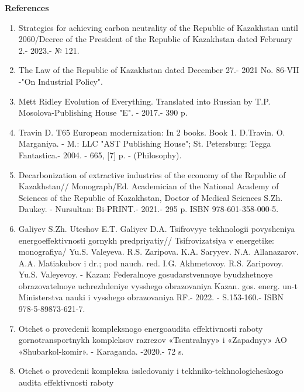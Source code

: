 \begin{center}
{\bfseries References}
\end{center}

\begin{enumerate}
\item
Strategies for achieving carbon neutrality of the Republic of
Kazakhstan until 2060/Decree of the President of the Republic of
Kazakhstan dated February 2.- 2023.- № 121.

\item
The Law of the Republic of Kazakhstan dated December 27.- 2021 No.
86-VII -"On Industrial Policy".

\item
Mеtt Ridley Evolution of Everything. Translated into Russian by T.P.
Mosolova-Publishing House "E". - 2017.- 390 p.

\item
Travin D. T65 European modernization: In 2 books. Book 1. D.Travin.
O. Marganiya. - M.: LLC "AST Publishing House"; St. Petersburg: Tegga
Fantastica.- 2004. - 665, {[}7{]} p. - (Philosophy).

\item
Decarbonization of extractive industries of the economy of the
Republic of Kazakhstan// Monograph/Ed. Academician of the National
Academy of Sciences of the Republic of Kazakhstan, Doctor of Medical
Sciences S.Zh. Daukey. - Nursultan: Bi-PRINT.- 2021.- 295 p. ISBN
978-601-358-000-5.

\item
Galiyev S.Zh. Uteshov E.T. Galiyev D.A. Tsifrovyye tekhnologii
povysheniya energoeffektivnosti gornykh predpriyatiy// Tsifrovizatsiya v
energetike: monografiya/ Yu.S. Valeyeva. R.S. Zaripova. K.A. Saryyev.
N.A. Allanazarov. A.A. Matiakubov i dr.; pod nauch. red. I.G.
Akhmetovoy. R.S. Zaripovoy. Yu.S. Valeyevoy. - Kazan: Federalnoye
gosudarstvennoye byudzhetnoye obrazovatelnoye uchrezhdeniye vysshego
obrazovaniya Kazan. gos. energ. un-t Ministerstva nauki i vysshego
obrazovaniya RF.- 2022. - S.153-160.- ISBN 978-5-89873-621-7.

\item
Otchet o provedenii kompleksnogo energoaudita effektivnosti raboty
gornotransportnykh kompleksov razrezov «Tsentralnyy» i «Zapadnyy» AO
«Shubarkol-komir». - Karaganda. -2020.- 72 s.

\item
Otchet o provedenii kompleksa issledovaniy i
tekhniko-tekhnologicheskogo audita effektivnosti raboty


\end{enumerate}
